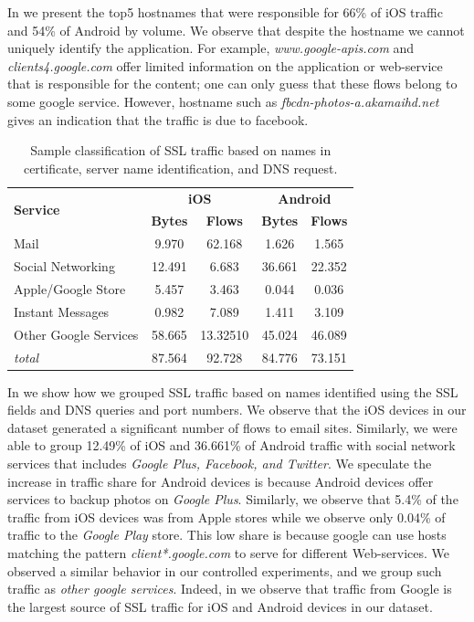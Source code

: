 In  we present the top5 hostnames that were responsible for 66\% of iOS traffic and 54\% of Android by volume. 
We observe that despite the hostname we cannot uniquely identify the application. 
For example, \emph{www.google-apis.com} and \emph{clients4.google.com} offer limited information on the application or web-service that is responsible for the content; one can only guess that these flows belong to some google service.
However, hostname such as \emph{fbcdn-photos-a.akamaihd.net} gives an indication that the traffic is due to facebook.

\begin{table}
\centering
\begin{small}
\begin{tabular}{|p{}|c|c|c|c|}
\hline
\multirow{2}{*}{\bf Service} & \multicolumn{2}{c|}{\bf iOS} &  \multicolumn{2}{c|}{\bf Android} \tabularnewline
\cline{2-5}
  & {\bf Bytes}  & {\bf Flows} & {\bf Bytes} & {\bf Flows} \tabularnewline
\hline
Mail                 & 9.970    & 62.168   & 1.626  & 1.565 \tabularnewline
\hline
Social Networking    & 12.491   & 6.683    & 36.661 & 22.352 \tabularnewline
\hline
Apple/Google Store   & 5.457    & 3.463    & 0.044  & 0.036 \tabularnewline
\hline
Instant Messages     & 0.982    & 7.089    & 1.411  & 3.109 \tabularnewline
\hline
Other Google Services & 58.665   & 13.32510 & 45.024 & 46.089 \tabularnewline
\hline
\emph{total}         & 87.564   & 92.728   & 84.776 & 73.151 \tabularnewline
\hline
\end{tabular} 
\end{small}
\caption{Sample classification of SSL traffic based on names in certificate, server name identification, and DNS request.}
\label{tab:classify-ssl-traffic}
\end{table}

In  we show how we grouped SSL traffic based on names identified using the SSL fields and DNS queries and port numbers.
We observe that the iOS devices in our dataset generated a significant number of flows to email sites.
Similarly, we were able to group 12.49\% of iOS and 36.661\% of Android traffic with social network services that includes \emph{Google Plus, Facebook, and Twitter}.
We speculate the increase in traffic share for Android devices is because Android devices offer services to backup photos on \emph{Google Plus}.
Similarly, we observe that 5.4\% of the traffic from iOS devices was from Apple stores while we observe only 0.04\% of traffic to the \emph{Google Play} store. 
This low share is because google can use hosts matching the pattern \emph{client*.google.com} to serve for different Web-services.
We observed a similar behavior in our controlled experiments, and we group such traffic as \emph{other google services}.
Indeed, in  we observe that traffic from Google is the largest source of SSL traffic for iOS and Android devices in our dataset. 
